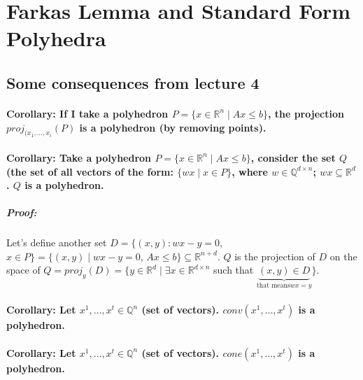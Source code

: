 \documentclass[main]{subfiles}
\begin{document}

\section{Farkas Lemma and Standard Form Polyhedra}

\subsection{Some consequences from lecture 4}

\paragraph{Corollary: If I take a polyhedron $P = \{ x \in \mathbb{R}^n \mid Ax
\leq b\}$, the projection $proj_{(x_1, \dots, x_i}(P)$ is a polyhedron (by
removing points). }

\paragraph{Corollary: Take a polyhedron $P = \{ x \in \mathbb{R}^n \mid Ax \leq
b\}$, consider the set $Q$ (the set of all vectors of the form: $\{ wx \mid x
\in P \}$, where $w \in \mathbb{Q}^{d \times n}$; $wx \subseteq \mathbb{R}^d$.
$Q$ is a polyhedron.}

\subparagraph{Proof:}
Let's define another set $D = \{(x,y): wx - y = 0$, $x \in P\} = \{(x,y) \mid
wx -y = 0$, $Ax \leq b\} \subseteq \mathbb{R}^{n+d}$. $Q$ is the projection of
$D$ on the space of $Q = proj_y (D) = \{ y \in \mathbb{R}^d \mid \exists x \in
\mathbb{R}^{d \times n}$ such that $\underbrace{(x,y) \in D}_{\text{that means
$wx =y$}} \}$.

\paragraph{Corollary: Let $x^1, \dots, x^t \in \mathbb{Q}^n$ (set of vectors).
$conv(x^1, \dots, x^t)$ is a polyhedron.}

\paragraph{Corollary: Let $x^1, \dots, x^t \in \mathbb{Q}^n$ (set of vectors). 
$cone(x^1, \dots, x^t)$ is a polyhedron.}
\end{document}
